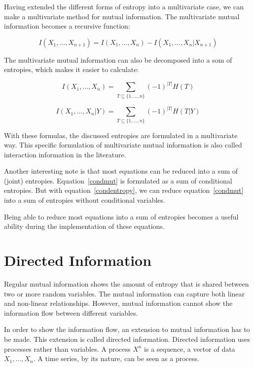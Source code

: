 Having extended the different forms of entropy into a multivariate case, we can make a multivariate method for mutual information. The multivariate mutual information becomes a recursive function:

\begin{equation}
I(X_1, ..., X_{n+1}) = I(X_1, ..., X_n) - I(X_1, ..., X_n | X_{n+1})
\end{equation}

The multivariate mutual information can also be decomposed into a som of entropies, which makes it easier to calculate:

\begin{equation}\label{mut}
I(X_1, ..., X_n) = \sum_{T \subseteq \{1,...,n\}} (-1)^{|T|}H(T)
\end{equation}

\begin{equation}\label{condmut}
I(X_1, ..., X_n | Y) = \sum_{T \subseteq \{1,...,n\}} (-1)^{|T|}H(T|Y)
\end{equation}
    
With these formulas, the discussed entropies are formulated in a multivariate way. This specific formulation of multivariate mutual information is also called interaction information in the literature.

Another interesting note is that most equations can be reduced into a sum of (joint) entropies. Equation~\ref{condmut} is formulated as a sum of conditional entropies. But with equation~\ref{condentropy}, we can reduce equation~\ref{condmut} into a sum of entropies without conditional variables. 

Being able to reduce most equations into a sum of entropies becomes a useful ability during the implementation of these equations.

\section{Directed Information}\label{directed-information}

Regular mutual information shows the amount of entropy that is shared between two or more random variables. The mutual information can capture both linear and non-linear relationships. However, mutual information cannot show the information flow between different variables. 

In order to show the information flow, an extension to mutual information has to be made. This extension is called directed information. Directed information uses processes rather than variables. A process $X^n$ is a sequence, a vector of data $X_1,...,X_n$. A time series, by its nature, can be seen as a process. \cite{blinowska2011review}

